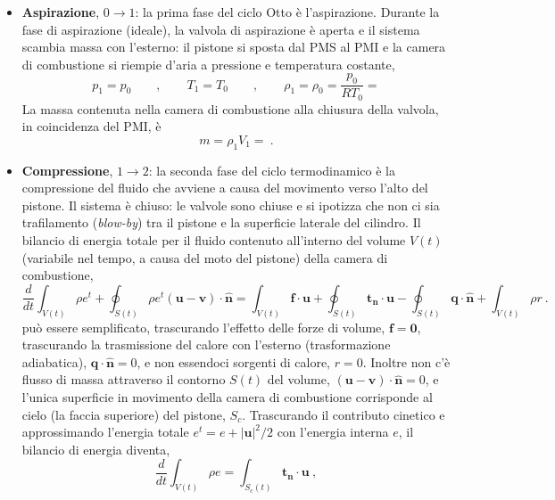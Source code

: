 \begin{itemize}
\item \textbf{Aspirazione}, $0 \rightarrow 1$: la prima fase del ciclo Otto è l'aspirazione. Durante la fase di aspirazione (ideale), la valvola di aspirazione è aperta e il sistema scambia massa con l'esterno: il pistone si sposta dal PMS al PMI e la camera di combustione si riempie d'aria a pressione e temperatura costante,
\begin{equation}
 p_1 = p_0 \qquad , \qquad
 T_1 = T_0 \qquad , \qquad
 \rho_1 = \rho_0 = \dfrac{p_0}{R T_0} =
\end{equation}
La massa contenuta nella camera di combustione alla chiusura della valvola, in coincidenza del PMI, è
\begin{equation}
 m = \rho_1 V_1 =  \ .
\end{equation}
\item \textbf{Compressione}, $1 \rightarrow 2$: la seconda fase del ciclo termodinamico è la compressione del fluido che avviene a causa del movimento verso l'alto del pistone. Il sistema è chiuso: le valvole sono chiuse e si ipotizza che non ci sia trafilamento (\textit{blow-by}) tra il pistone e la superficie laterale del cilindro. Il bilancio di energia totale per il fluido contenuto all'interno del volume $V(t)$ (variabile nel tempo, a causa del moto del pistone) della camera di combustione,
\begin{equation}
 \dfrac{d}{dt} \displaystyle\int_{V(t)} \rho e^t + \oint_{S(t)} \rho e^t (\bm{u}-\bm{v}) \cdot \bm{\hat{n}}= \int_{V(t)} \bm{f} \cdot \bm{u} + \oint_{S(t)} \bm{t_n} \cdot \bm{u} - \oint_{S(t)} \bm{q} \cdot \bm{\hat{n}} + \int_{V(t)} \rho r \ .
\end{equation}
può essere semplificato, trascurando l'effetto delle forze di volume, $\bm{f} = \bm{0}$, trascurando la trasmissione del calore con l'esterno (trasformazione adiabatica), $\bm{q} \cdot \bm{\hat{n}} = 0$, e non essendoci sorgenti di calore, $r = 0$. Inoltre non c'è flusso di massa attraverso il contorno $S(t)$ del volume, $(\bm{u}-\bm{v}) \cdot \bm{\hat{n}} = 0$, e l'unica superficie in movimento della camera di combustione corrisponde al cielo (la faccia superiore) del pistone, $S_{c}$. Trascurando il contributo cinetico e approssimando l'energia totale $e^t = e + |\bm{u}|^2/2$ con l'energia interna $e$, il bilancio di energia diventa,
\begin{equation}
 \dfrac{d}{dt} \displaystyle\int_{V(t)} \rho e = \int_{S_c(t)} \bm{t_n} \cdot \bm{u} \ ,
\end{equation}

\end{itemize}
